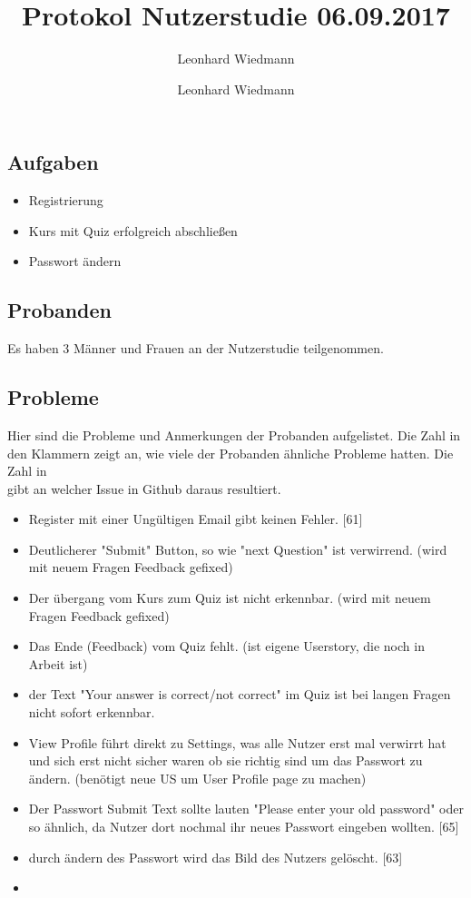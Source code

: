 \documentclass[colorback, accentcolor=tud1c, paper=a4]{tudexercise}
\title{Protokol Nutzerstudie 06.09.2017}
\subtitle{Leonhard Wiedmann}
\author{Leonhard Wiedmann}
\begin{document}
\maketitle
\subsection*{Aufgaben}
\begin{itemize}
  \item Registrierung
  \item Kurs mit Quiz erfolgreich abschließen
  \item Passwort ändern
\end{itemize}

\subsection*{Probanden}
Es haben 3 Männer und Frauen an der Nutzerstudie teilgenommen.

\subsection*{Probleme}
 Hier sind die Probleme und Anmerkungen der Probanden aufgelistet. Die Zahl in den Klammern zeigt an, wie viele der Probanden ähnliche Probleme hatten. Die Zahl in \[\] gibt an welcher Issue in Github daraus resultiert.
  \begin{itemize}
		\item Register mit einer Ungültigen Email gibt keinen Fehler. [61]
    \item Deutlicherer "Submit" Button, so wie "next Question" ist verwirrend. (wird mit neuem Fragen Feedback gefixed)
		\item Der übergang vom Kurs zum Quiz ist nicht erkennbar. (wird mit neuem Fragen Feedback gefixed)
		\item Das Ende (Feedback) vom Quiz fehlt. (ist eigene Userstory, die noch in Arbeit ist)
		\item der Text "Your answer is correct/not correct" im Quiz ist bei langen Fragen nicht sofort erkennbar.
		\item View Profile führt direkt zu Settings, was alle Nutzer erst mal verwirrt hat und sich erst nicht sicher waren ob sie richtig sind um das Passwort zu ändern. (benötigt neue US um User Profile page zu machen)
		\item Der Passwort Submit Text sollte lauten "Please enter your old password" oder so ähnlich, da Nutzer dort nochmal ihr neues Passwort eingeben wollten. [65]
		\item durch ändern des Passwort wird das Bild des Nutzers gelöscht. [63]
		\item
   \end{itemize}
\end{document}
